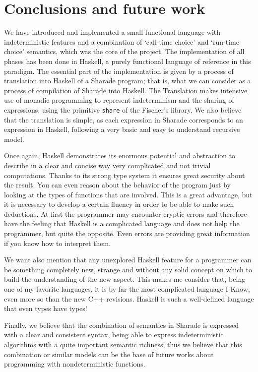 \documentclass[class=article, crop=false]{standalone}
\begin{document}
\section{Conclusions and future work}
We have introduced and implemented a small functional language with indeterministic
features and a combination of `call-time choice' and `run-time choice' semantics, which was
the core of the project. The implementation of all phases has been done in Haskell, a purely
functional language of reference in this paradigm. The essential part of the implementation
is given by a process of translation into Haskell of a Sharade program; that is, what we can
consider as a process of compilation of Sharade into Haskell. The Translation makes intensive
use of monadic programming to represent indeterminism and the sharing of expressions, using
the primitive \verb`share` of the Fischer's library. We also believe that the translation is
simple, as each expression in Sharade corresponds to an expression in Haskell, following a
very basic and easy to understand recursive model.

Once again, Haskell demonstrates its enormous potential and abstraction to describe in a
clear and concise way very complicated and not trivial computations. Thanks to its strong
type system it ensures great security about the result. You can even reason about the
behavior of the program just by looking at the types of functions that are involved. This is
a great advantage, but it is necessary to develop a certain fluency in order to be able to
make such deductions. At first the programmer may encounter cryptic errors and therefore have
the feeling that Haskell is a complicated language and does not help the programmer, but
quite the opposite. Even errors are providing great information if you know how to interpret
them.

We want also mention that any unexplored Haskell feature for a programmer can be
something completely new, strange and without any solid concept on which to build the
understanding of the new aspect. This makes me consider that, being one of my favorite
languages, it is by far the most complicated language I Know, even more so than the new
C++ revisions. Haskell is such a well-defined language that even types have types!

Finally, we believe that the combination of semantics in Sharade is expressed with a clear
and consistent syntax, being able to express indeterministic algorithms with a quite
important semantic richness; thus we believe that this combination or similar models
can be the base of future works about programming with nondeterministic functions.
\end{document}
